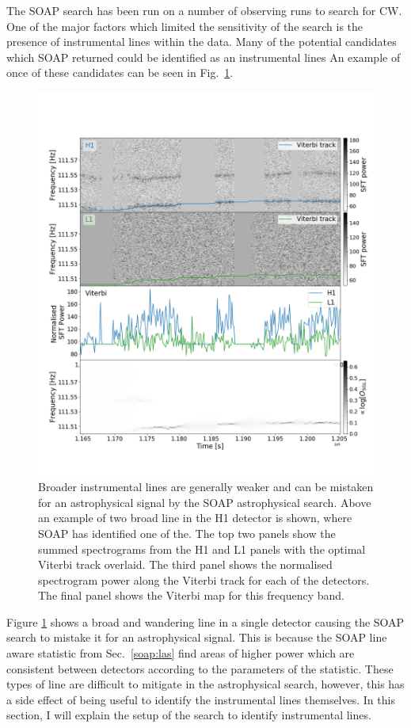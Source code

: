 % 
The SOAP search has been run on a number of observing runs to search for \gls{CW}. 
One of the major factors which limited the sensitivity of the search is the presence of instrumental lines within the data. 
Many of the potential candidates which SOAP returned could be identified as an instrumental lines 
An example of once of these candidates can be seen in Fig.~\ref{detchar:soap:astrowander}.
%
\begin{figure}[h]
	\includegraphics[width=\textwidth]{C5_detchar/plot_F111_5_wandering_line.png}
	\caption[Broad wandering line example.]{Broader instrumental lines are generally weaker and can be mistaken for an astrophysical signal by the SOAP astrophysical search. Above an example of two broad line in the H1 detector is shown, where SOAP has identified one of the. The top two panels show the summed spectrograms from the H1 and L1 panels with the optimal Viterbi track overlaid. The third panel shows the normalised spectrogram power along the Viterbi track for each of the detectors. The final panel shows the Viterbi map for this frequency band.}
	\label{detchar:soap:astrowander}
\end{figure}
%
Figure \ref{detchar:soap:astrowander} shows a broad and wandering line in a single detector causing the SOAP search to mistake it for an astrophysical signal. 
This is because the SOAP line aware statistic from Sec.~\ref{soap:las} find areas of higher power which are consistent between detectors according to the parameters of the statistic. 
These types of line are difficult to mitigate in the astrophysical search, however, this has a side effect of being useful to identify the instrumental lines themselves.
In this section, I will explain the setup of the search to identify instrumental lines.

